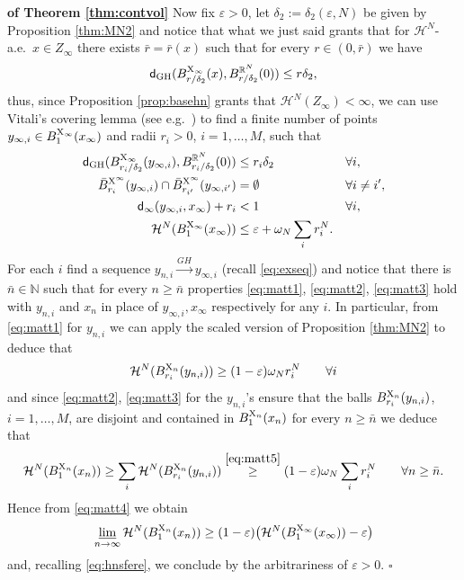 \documentclass[reqno,11pt]{article}
\numberwithin{equation}{section}
\newcommand{\N}{\mathbb{N}}
\newcommand{\R}{\mathbb{R}}
\newcommand{\sfd}{{\sf d}}
\newcommand{\eps}{\varepsilon}
\newcommand{\limi}{\varliminf}
\newenvironment{proofb}{\removelastskip\par\medskip   %
\noindent{\em{\bf Proof}} \rm}{\penalty-20\null\hfill$\square$\par\medbreak}
\newcommand{\X}{{\rm X}}
\newcommand{\HH}{{\mathcal H}}
\begin{document}
\begin{proofb}{\bf of Theorem \ref{thm:contvol}}
Now fix $\eps>0$, let $\delta_2:=\delta_2(\eps,N)$ be given by Proposition \ref{thm:MN2} and notice that what we just said grants that for $\HH^N$-a.e.\ $x\in Z_\infty$ there exists $\bar r=\bar r(x)$ such that for every $r\in(0,\bar r)$ we have 
\[
\sfd_{\rm GH}(B^{\X_\infty}_{r/\delta_2}(x),B^{\R^N}_{r/\delta_2}(0))\leq r\delta_2,
\]
thus, since Proposition \ref{prop:basehn} grants that $\HH^N(Z_\infty)<\infty$, we can use Vitali's covering lemma (see e.g.\ \cite[Theorem 2.2.2]{AmbrosioTilli04}) to find a finite number of points $y_{\infty,i}\in B^{\X_\infty}_1(x_\infty)$ and radii $r_i>0$, $i=1,\ldots,M$, such that
\begin{subequations}
\begin{align}
\label{eq:matt1}
\sfd_{\rm GH}(B^{\X_\infty}_{r_i/\delta_2}(y_{\infty,i}),B^{\R^N}_{r_i/\delta_2}(0))&\leq r_i\delta_2\qquad&&\forall i,\\
\label{eq:matt2}
\bar B^{\X^\infty}_{r_i}(y_{\infty,i})\cap\bar B^{\X^\infty}_{r_{i'}}(y_{\infty,i'})&=\emptyset \qquad&&\forall i\neq i',\\
\label{eq:matt3}
\sfd_\infty(y_{\infty,i},x_\infty)+r_i&<1\qquad&&\forall i,\\
\label{eq:matt4}
\HH^N(B^{\X_\infty}_1(x_\infty))&\leq\eps+\omega_N\sum_ir_i^N.
\end{align}
\end{subequations}
For each $i$ find a sequence $y_{n,i}\stackrel{GH}\to y_{\infty,i}$ (recall \eqref{eq:exseq}) and notice that there is $\bar n\in \N$ such that for every $n\geq \bar n$ properties \eqref{eq:matt1}, \eqref{eq:matt2}, \eqref{eq:matt3} hold with $y_{n,i}$ and $x_n$ in place of $y_{\infty,i},x_\infty$ respectively for any $i$. In particular, from \eqref{eq:matt1} for $y_{n,i}$ we can apply the scaled version of Proposition \ref{thm:MN2} to deduce that
\begin{equation}
\label{eq:matt5}
\HH^N(B^{\X_n}_{r_i}(y_{n,i}))\geq (1-\eps)\omega_Nr_i^N\qquad\forall i
\end{equation}
and since  \eqref{eq:matt2}, \eqref{eq:matt3} for the $y_{n,i}$'s ensure that the balls $B^{\X_n}_{r_i}(y_{n,i})$, $i=1,\ldots,M$, are disjoint and contained in $B_1^{\X_n}(x_n)$ for every $n\geq\bar n$ we deduce that
\[
\begin{split}
\HH^N(B_1^{\X_n}(x_n))\geq\sum_i\HH^N(B^{\X_n}_{r_i}(y_{n,i}))\stackrel{\eqref{eq:matt5}}\geq (1-\eps)\omega_N\sum_ir_i^N\qquad\forall n\geq \bar n.
\end{split}
\]
Hence  from \eqref{eq:matt4} we obtain
\[
\limi_{n\to\infty}\HH^N(B_1^{\X_n}(x_n))\geq (1-\eps)\big(\HH^N(B^{\X_\infty}_1(x_\infty))-\eps\big)
\]
and, recalling \eqref{eq:hnsfere}, we conclude by the arbitrariness of $\eps>0$.
\end{proofb}
\end{document}
